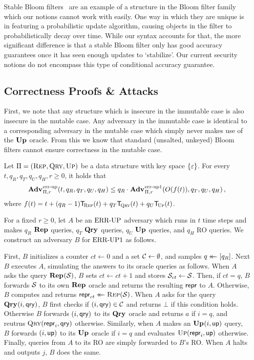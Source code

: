 Stable Bloom filters~\cite{xxx} are an example of a structure in the Bloom filter family which our notions cannot work with easily. One way in which they are unique is in featuring a probabilistic update algorithm, causing objects in the filter to probabilistically decay over time. While our syntax accounts for that, the more significant difference is that a stable Bloom filter only has good accuracy guarantees once it has seen enough updates to `stabilize'. Our current security notions do not encompass this type of conditional accuracy guarantee.

\subsection{Correctness Proofs \& Attacks}

First, we note that any structure which is insecure in the immutable case is also insecure in the mutable case. Any adversary in the immutable case is identical to a corresponding adversary in the mutable case which simply never makes use of the $\mathbf{Up}\hspace{0.5pt}$ oracle. From this we know that standard (unsalted, unkeyed) Bloom filters cannot ensure correctness in the mutable case.

\begin{lemma}\label{lemma:errep}
  Let $\mathrm{\Pi} = (\textsc{Rep}, \textsc{Qry}, \textsc{Up})$ be a data structure with key
  space $\{\varepsilon\}$. For every $t, q_R, q_T, q_U, q_H, r\geq 0$, it holds that
  \[
    \Adv{\errep}_{\struct,r}(t, q_R, q_T, q_U, q_H) \leq
    q_R\cdot\Adv{\errep1}_{\struct,r}(O(f(t)), q_T, q_U, q_H) \,,
  \]
  where $f(t) = t + (q_R-1)\ticks(\Rep,t) + q_T\ticks(\Qry,t) + q_U\ticks(\Up,t)$.
\end{lemma}

For a fixed $r \ge 0$, let $A$ be an $\textnormal{ERR\mbox{-}UP}$ adversary which runs in $t$ time steps and makes $q_R$ $\mathbf{Rep}\hspace{0.5pt}$ queries, $q_T$ $\mathbf{Qry}\hspace{0.5pt}$ queries, $q_U$ $\mathbf{Up}\hspace{0.5pt}$ queries, and $q_H$ RO queries. We construct an adversary $B$ for $\textnormal{ERR\mbox{-}UP}1$ as follows.

First, $B$ initializes a counter $ct \gets 0$ and a set $\mathcal{C} \gets \emptyset$, and samples $q \mathrel{\leftarrow\mkern-14mu\leftarrow} [q_R]$. Next $B$ executes $A$, simulating the answers to its oracle queries as follows. When $A$ asks the query $\mathbf{Rep}\hspace{0.5pt}(\mathcal{S})$, $B$ sets $ct \gets ct + 1$ and stores $\mathcal{S}_{ct} \gets \mathcal{S}$. Then, if $ct = q$, $B$ forwards $\mathcal{S}$ to its own $\mathbf{Rep}\hspace{0.5pt}$ oracle and returns the resulting $\mathsf{repr}$ to $A$. Otherwise, $B$ computes and returns $\mathsf{repr}_{ct} \mathrel{\leftarrow\mkern-14mu\leftarrow} \textsc{Rep}(\mathcal{S})$. When $A$ asks for the query $\mathbf{Qry}\hspace{0.5pt}(i,\mathsf{qry})$, $B$ first checks if $(i,\mathsf{qry}) \in \mathcal{C}$ and returns $\bot$ if this condition holds. Otherwise $B$ forwards $(i,\mathsf{qry})$ to its $\mathbf{Qry}\hspace{0.5pt}$ oracle and returns $a$ if $i = q$, and reutrns $\textsc{Qry}(\mathsf{repr}_i,\mathsf{qry})$ otherwise. Similarly, when $A$ makes an $\mathbf{Up}\hspace{0.5pt}(i,\mathsf{up})$ query, $B$ forwards $(i,\mathsf{up})$ to its $\mathbf{Up}\hspace{0.5pt}$ oracle if $i = q$ and evaluates $\textsc{Up}(\mathsf{repr}_i,\mathsf{up})$ otherwise. Finally, queries from $A$ to its RO are simply forwarded to $B$'s RO. When $A$ halts and outputs $j$, $B$ does the same.

